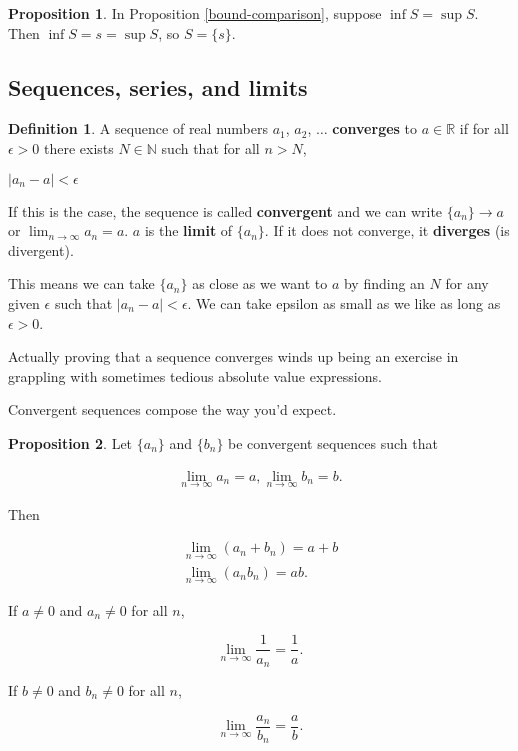 \documentclass{article}
\theoremstyle{definition}
\newtheorem{definition}{Definition}[section]
\newtheorem{proposition}{Proposition}[section]
\begin{document}
\begin{proposition}
In Proposition \ref{bound-comparison}, suppose $\inf S = \sup S$. Then $\inf S = s = \sup S$, so $S = \{s\}$.
\end{proposition}

\subsection{Sequences, series, and limits}

\begin{definition} 
A sequence of real numbers $a_1$, $a_2$, $\ldots$ \textbf{converges} to $a \in \mathbb{R}$ if for all $\epsilon > 0$ there exists $N \in \mathbb{N}$ such that for all $n > N$,

\begin{center}
$|a_n - a| < \epsilon$
\end{center}

If this is the case, the sequence is called \textbf{convergent} and we can write $\{a_n\} \to a$ or $\lim_{n \to \infty} a_n = a$. $a$ is the \textbf{limit} of $\{a_n\}$. If it does not converge, it \textbf{diverges} (is divergent).
\end{definition}

This means we can take $\{a_n\}$ as close as we want to $a$ by finding an $N$ for any given $\epsilon$ such that $|a_n - a| < \epsilon$. We can take epsilon as small as we like as long as $\epsilon > 0$.

Actually proving that a sequence converges winds up being an exercise in grappling with sometimes tedious
absolute value expressions.

Convergent sequences compose the way you'd expect.

\pagebreak

\begin{proposition}
Let $\{a_n\}$ and $\{b_n\}$ be convergent sequences such that

\begin{align}
\lim_{n \to \infty} a_n = a, \lim_{n \to \infty} b_n = b.
\end{align}

Then

\begin{align}
\lim_{n \to \infty} (a_n + b_n) = a + b \\
\lim_{n \to \infty} (a_n b_n) = ab.
\end{align}

If $a \neq 0$ and $a_n \neq 0$ for all $n$,

\begin{equation}
\lim_{n \to \infty} \frac{1}{a_n} = \frac{1}{a}.
\end{equation}

If $b \neq 0$ and $b_n \neq 0$ for all $n$,

\begin{equation}
\lim_{n \to \infty} \frac{a_n}{b_n} = \frac{a}{b}.
\end{equation}

\end{proposition}
\end{document}
